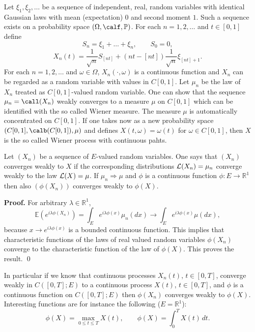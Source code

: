 \documentclass[preprint]{imsart}
\def\P{\mathbb P}
\def\E{\mathbb E}
\def\R{\mathbb R}
\begin{document}
{\begin{Example}\begin{em}
Let $\xi_1,\xi_2,\ldots$ be a sequence of independent,
real, random variables with identical Gaussian laws
with mean (expectation) $0$ and second moment $1$. Such
a sequence exists on a probability space
$(\Omega,\calf,\P)$. For each $n=1,2,\ldots$ and $t\in
[0,1]$ define
$$
S_n=\xi_1+\ldots+\xi_n,\qquad S_0=0,
$$
$$
X_n(t)= \frac{1}{\sqrt{n}}S_{[nt]} + (nt-[nt])
 \frac{1}{\sqrt{n}}\xi_{[nt]+1}.
$$
For each $n=1,2,\ldots$ and $\omega\in\Omega$,
$X_n(\cdot,\omega)$ is a continuous function and $X_n$
can be regarded as a random variable with values in
$C[0,1]$. Let $\mu_n$ be the law of $X_n$ treated as
$C[0,1]$-valued random variable. One can show that the
sequence $\mu_n=\call(X_n)$ weakly converges to a
measure $\mu$ on $C[0,1]$ which can be identified with
the so called Wiener measure. The measure $\mu$ is
automatically concentrated on $C[0,1]$. If one takes
now as a new probability space $(C[0,1],\calb (C[0,1]),
\mu)$ and defines $X(t,\omega)=\omega (t)$ for
$\omega\in C[0,1]$, then $X$ is the so called Wiener
process with continuous pahts.
\end{em}
\end{Example}
Let $(X_n)$ be a sequence of $E$-valued random variables. One
says that  $(X_n)$  converges weakly to $X$ if the corresponding
distributions ${\cal L}(X_n) = \mu_n$  converge weakly to the law
 ${\cal L}(X) = \mu$.   If $\mu_n\Rightarrow\mu$ and $\phi$ is a
continuous function $\phi:E\to \R^1$ then also  $(\phi(X_n))$
converges weakly to $\phi(X)$.

{\bf Proof.}
For arbitrary $\lambda\in\R^1$,
$$
\E \left( e^{i\lambda\phi(X_n)}\right)
=\int_E   e^{i\lambda\phi(x)}\mu_n(dx)
\to \int_E   e^{i\lambda\phi(x)}\mu(dx),
$$
because $x\to e^{i\lambda\phi(x)}$ is a bounded continuous
function. This implies that characteristic functions of the laws of
real valued random variables $\phi(X_n)$ converge to the
characteristic function of the law of $\phi (X)$. This proves the
result. \qed

In particular if we know that continuous processes $X_n(t)$, $t\in
[0,T]$, converge weakly in $C([0,T];E)$ to a continuous process
 $X(t)$, $t\in [0,T]$,  and $\phi$ is a continuous function on
 $C([0,T];E)$ then $\phi(X_n)$  converges weakly to $\phi(X)$.
Interesting functions are for instance the following ($E=\R^1$):
$$
\phi (X)=\max_{0\leq t\leq T}X(t),
\qquad
\phi (X)=\int_0^TX(t)\, dt.
$$



}
\end{document}
